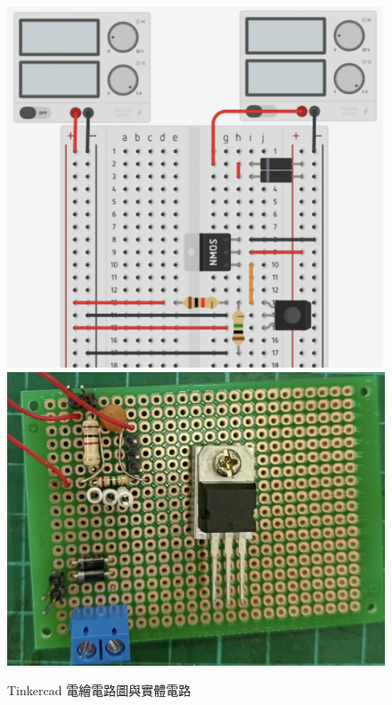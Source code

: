 \documentclass[12pt,a4paper]{article}
\begin{document}
\begin{CJK*}{UTF8}{bkai}
\begin{enumerate}
\begin{figure}[h]
                  \includegraphics[height=0.25\textheight]{./images/circuit_digital.png}
                  \includegraphics[height=0.25\textheight]{./images/circuit_real.png}
                  \caption{Tinkercad 電繪電路圖與實體電路}
              \end{figure}
    \end{enumerate}


\end{CJK*}
\end{document}

